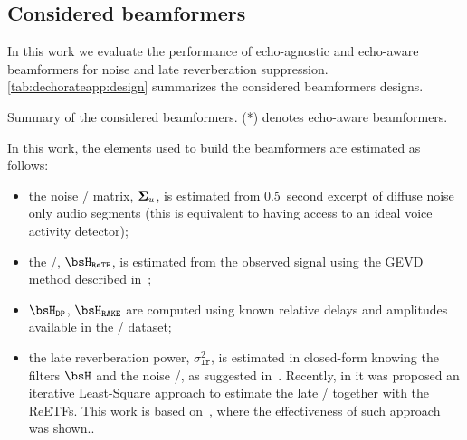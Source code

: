 \subsection{Considered beamformers}
In this work we evaluate the performance of echo-agnostic and echo-aware beamformers for noise and late reverberation suppression.
\cref{tab:dechorateapp:design} summarizes the considered beamformers designs.

\begin{table}[t]
    \begin{fullwidth}

        \centering
        \footnotesize
        
        \caption{Summary of the considered beamformers. (*) denotes echo-aware beamformers.}
        \label{tab:dechorateapp:design}

    \end{fullwidth}
\end{table}

\mynewline
In this work, the elements used to build the beamformers are estimated as follows:
\begin{itemize}
    \item the noise \PSD/ matrix, $\boldsymbol{\Sigma}_{u} $, is estimated from 0.5~second excerpt of diffuse noise only audio segments (this is equivalent to having access to an ideal voice activity detector);
    \item the \ReTF/, $\FLTS_{\mathtt{ReTF}}$, is estimated from the observed signal using the \acf{GEVD} method described in~;
    \item $\FLTS_{\mathtt{DP}}$, $\FLTS_{\mathtt{RAKE}}$ are computed using known relative delays and amplitudes available in the \DECHORATE/ dataset;
    \item the late reverberation power, $\sigma_{\mathtt{lr}}^2$, is estimated in closed-form knowing the filters $\FLTS$ and the noise \PSD/, as suggested in~.
    Recently, in  it was proposed an iterative Least-Square approach to estimate the late \PSD/ together with the \acfp{ReETF}.
    This work is based on~, where the effectiveness of such approach was shown..
\end{itemize}

